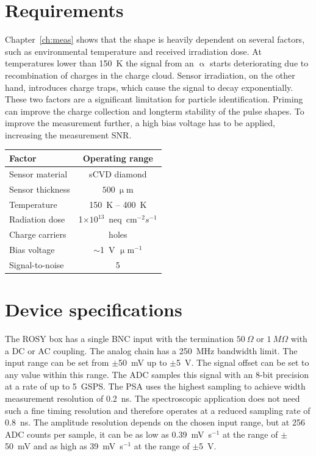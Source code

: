 \section{Requirements}
Chapter~\ref{ch:meas} shows that the shape is heavily dependent on several factors, such as environmental temperature and received irradiation dose. At temperatures lower than 150~K the signal from an $\upalpha$ starts deteriorating due to recombination of charges in the charge cloud. Sensor irradiation, on the other hand, introduces charge traps, which cause the signal to decay exponentially. These two factors are a significant limitation for particle identification. Priming can improve the charge collection and longterm stability of the pulse shapes. To improve the measurement further, a high bias voltage has to be applied, increasing the measurement SNR. 
\begin{center}
\begin{tabular}{l*{1}{c}}
Factor              & Operating range \\
\hline
Sensor material & sCVD diamond \\
Sensor thickness & $500~\upmu$m \\
Temperature & 150~K -- 400~K \\
Radiation dose & 1$\times10^{13}$~neq~cm$^{-2} s^{-1}$ \\
Charge carriers & holes \\
Bias voltage & $\sim$1~V $\upmu$m$^{-1}$ \\
Signal-to-noise & 5 \\
\end{tabular}
\label{tab:limits}
\end{center}



\section{Device specifications}
The ROSY box has a single BNC input with the termination $50~\Omega$ or $1~M\Omega$ with a DC or AC coupling. The analog chain has a 250~MHz bandwidth limit. The input range can be set from $\pm$50~mV up to $\pm$5~V. The signal offset can be set to any value within this range. The ADC samples this signal with an 8-bit precision at a rate of up to 5~GSPS. The PSA uses the highest sampling to achieve width measurement resolution of 0.2~ns. The spectroscopic application does not need such a fine timing resolution and therefore operates at a reduced sampling rate of 0.8~ns. The amplitude resolution depends on the chosen input range, but at 256 ADC counts per sample, it can be as low as 0.39~mV~s$^{-1}$ at the range of $\pm$50~mV and as high as 39~mV~s$^{-1}$ at the range of $\pm$5~V.

